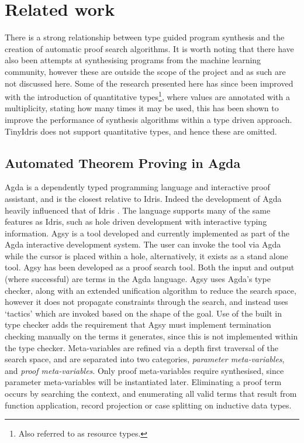 \documentclass[a4paper]{article}
\begin{document}
\section{Related work}
\label{sec:org210f32d}
There is a strong relationship between type guided program synthesis and the creation of automatic proof search algorithms.
It is worth noting that there have also been attempts at synthesising programs from the machine learning community, however these
are outside the scope of the project and as such are not discussed here. Some of the research presented here has since been 
improved with the introduction of quantitative types\footnote{Also referred to as resource types.}, where values are annotated with a multiplicity, stating how many 
times it may be used, this has been shown \cite{10.1145/3314221.3314602} to improve the performance of synthesis algorithms within
a type driven approach. TinyIdris does not support quantitative types, and hence these are omitted.

\subsection{Automated Theorem Proving in Agda}
\label{sec:org9fafe7d}
Agda is a dependently typed programming language and interactive proof assistant, and is the closest relative to Idris.
Indeed the development of Agda heavily influenced that of Idris \cite{Splv'202020Aug} . The language supports many
of the same features as Idris, such as hole driven development with interactive typing information. 
Agsy is a tool developed and currently implemented as part of the Agda interactive development system.
The user can invoke the tool via Agda while the cursor is placed within a hole, alternatively, it exists as a stand alone tool.
Agsy has been developed as a proof search tool.
Both the input and output (where successful) are terms in the Agda language. Agsy uses Agda's type checker,
along with an extended unification algorithm to reduce the search space, however it does not propagate constraints
through the search, and instead uses `tactics' which are invoked based on the shape of the goal. Use of the built in type
checker adds the requirement that Agsy must implement termination checking manually on the terms it generates, since this 
is not implemented within the type checker. Meta-variables are refined via a depth first traversal of the search space, and are separated into 
two categories, \emph{parameter meta-variables}, and \emph{proof meta-variables}. Only proof meta-variables require synthesised, since parameter 
meta-variables will be instantiated later. Eliminating a proof term occurs by searching the context,
and enumerating all valid terms that result from function application, record projection or case splitting on inductive data types.
\end{document}
